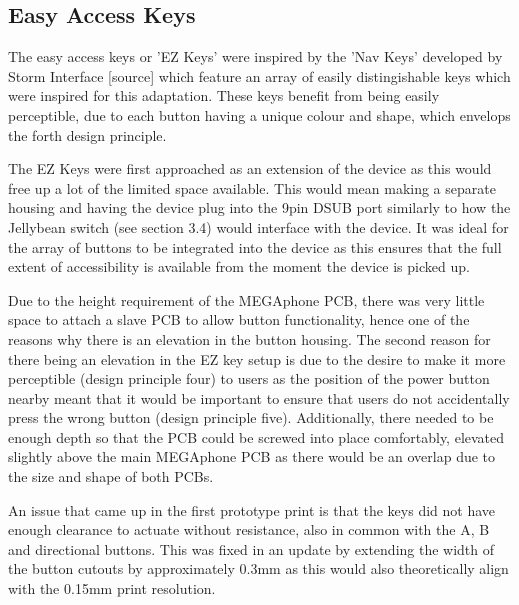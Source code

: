 \subsection{Easy Access Keys}

The easy access keys or 'EZ Keys' were inspired by the 'Nav Keys' developed by Storm Interface [source] which feature an array of easily distingishable keys which were inspired for this adaptation.
These keys benefit from being easily perceptible, due to each button having a unique colour and shape, which envelops the forth design principle.

The EZ Keys were first approached as an extension of the device as this would free up a lot of the limited space available.
This would mean making a separate housing and having the device plug into the 9pin DSUB port similarly to how the Jellybean switch (see section 3.4) would interface with the device.
It was ideal for the array of buttons to be integrated into the device as this ensures that the full extent of accessibility is available from the moment the device is picked up.

Due to the height requirement of the MEGAphone PCB, there was very little space to attach a slave PCB to allow button functionality, hence one of the reasons why there is an elevation in the button housing.
The second reason for there being an elevation in the EZ key setup is due to the desire to make it more perceptible (design principle four) to users as the position of the power button nearby meant that it would be important to ensure that users do not accidentally press the wrong button (design principle five).
Additionally, there needed to be enough depth so that the PCB could be screwed into place comfortably, elevated slightly above the main MEGAphone PCB as there would be an overlap due to the size and shape of both PCBs.

An issue that came up in the first prototype print is that the keys did not have enough clearance to actuate without resistance, also in common with the A, B and directional buttons.
This was fixed in an update by extending the width of the button cutouts by approximately 0.3mm as this would also theoretically align with the 0.15mm print resolution. %


